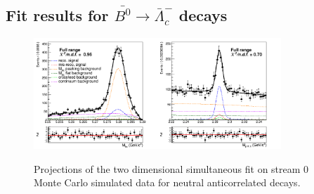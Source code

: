         
\subsection{Fit results for $\bar{B^0} \rightarrow \bar{\Lambda}_c^-$ decays} 


\begin{table}[H]
    \centering
    \caption{Neutral anticorrelated decays: comparison of fitted and expected signal yields, fitted and truth-matched total signal for six streams of Belle generic MC when fitting the two dimensional distributions of $M_{bc}$ and $M(p K \pi)$.}
    \label{tab:SixStreams_neutral_anticorrLam2Dfits}
    \end{table}

\begin{figure}
\centering
{\includegraphics[width=0.83\textwidth]{04-SimultaneousFit/figs/neutral_anticorrSample_simultaneous2DFit_stream0.png}}
\caption{Projections of the two dimensional simultaneous fit on stream 0 Monte Carlo simulated data for neutral anticorrelated decays.}
\label{fig:neutral_anticorrSample_simultaneous2DFit_stream0}
\end{figure}

